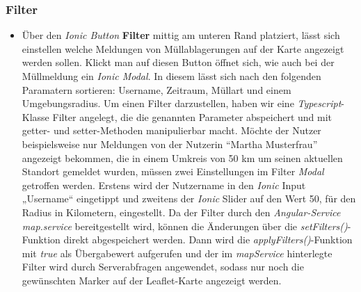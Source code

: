 \documentclass[a4paper, 11pt, DIV=11, listof=numbered, numbers=noenddot]{scrartcl}
\begin{document}
	\subsubsection{Filter}
	\begin {itemize}
		\item Über den \textit{Ionic Button} \textbf{Filter} mittig am unteren Rand platziert, lässt sich einstellen welche Meldungen von Müllablagerungen auf der Karte angezeigt werden sollen. Klickt man auf diesen Button öffnet sich, wie auch bei der Müllmeldung ein 					\textit{Ionic Modal}. In diesem lässt sich nach den folgenden Paramatern sortieren: Username, Zeitraum, Müllart und einem Umgebungsradius. Um einen Filter darzustellen, haben wir eine \textit{Typescript}-Klasse Filter angelegt, die die genannten Parameter 				abspeichert und mit getter- und setter-Methoden manipulierbar macht.
			Möchte der Nutzer beispielsweise nur Meldungen von der Nutzerin “Martha Musterfrau” angezeigt bekommen, die in einem Umkreis von 50 km um seinen aktuellen Standort gemeldet wurden, müssen zwei Einstellungen im Filter \textit{Modal} getroffen werden. 				Erstens wird der Nutzername in den \textit{Ionic} Input „Username“ eingetippt und zweitens der \textit{Ionic} Slider auf den Wert 50, für den Radius in Kilometern, eingestellt.
			Da der Filter durch den \textit{Angular-Service map.service} bereitgestellt wird, können die Änderungen über die \textit{setFilters()}-Funktion direkt abgespeichert werden. Dann wird die \textit{applyFilters()}-Funktion mit \textit{true} als Übergabewert 				aufgerufen und der im \textit{mapService} hinterlegte Filter wird durch Serverabfragen angewendet, sodass nur noch die gewünschten Marker auf der Leaflet-Karte angezeigt werden.
	\end {itemize}
	
\end{document}

